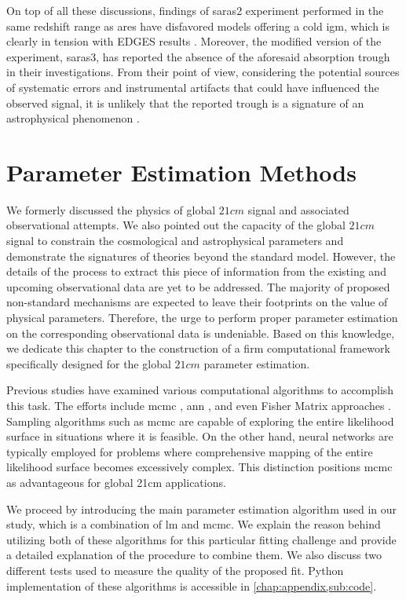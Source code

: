 \documentclass[12pt, TexShade, letterpaper]{report}
\begin{document}
 On top of all these discussions, findings of \gls{saras}2 experiment performed in the same redshift range as \gls{ares} have disfavored models offering a cold \gls{igm}, which is clearly in tension with EDGES results \cite{saras_2_constrains, saras_2_results}. Moreover, the modified version of the experiment, \gls{saras}3, has reported the absence of the aforesaid absorption trough in their investigations. From their point of view, considering the potential sources of systematic errors and instrumental artifacts that could have influenced the observed signal, it is unlikely that the reported trough is a signature of an astrophysical phenomenon \cite{saras_3_results, saras_curse_edges}.\par
\chapter{Parameter Estimation Methods}
\label{chap:method}
We formerly discussed the physics of global $21cm$ signal and associated observational attempts. We also pointed out the capacity of the global $21cm$ signal to constrain the cosmological and astrophysical parameters and demonstrate the signatures of theories beyond the standard model. However, the details of the process to extract this piece of information from the existing and upcoming observational data are yet to be addressed. The majority of proposed non-standard mechanisms are expected to leave their footprints on the value of physical parameters. Therefore, the urge to perform proper parameter estimation on the corresponding observational data is undeniable. Based on this knowledge, we dedicate this chapter to the construction of a firm computational framework specifically designed for the global $21cm$ parameter estimation. \par
Previous studies have examined various computational algorithms to accomplish this task. The efforts include \gls{mcmc} \cite{pe_mcmc_1, pe_mcmc_2}, \gls{ann} \cite{pe_nn_1}, and even Fisher Matrix approaches \cite{pe_fisher_2}. Sampling algorithms such as \gls{mcmc} are capable of exploring the entire likelihood surface in situations where it is feasible. On the other hand, neural networks are typically employed for problems where comprehensive mapping of the entire likelihood surface becomes excessively complex. This distinction positions \gls{mcmc} as advantageous for global 21cm applications.\par
We proceed by introducing the main parameter estimation algorithm used in our study, which is a combination of \gls{lm} and \gls{mcmc}. We explain the reason behind utilizing both of these algorithms for this particular fitting challenge and provide a detailed explanation of the procedure to combine them. We also discuss two different tests used to measure the quality of the proposed fit. Python implementation of these algorithms is accessible in \ref{chap:appendix,sub:code}.
\end{document}
